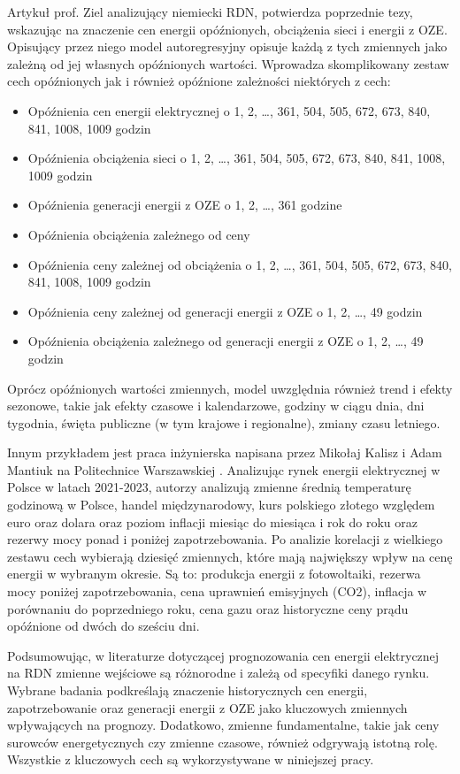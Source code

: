 Artykuł prof. Ziel \cite{ZIEL201598} analizujący niemiecki RDN, potwierdza poprzednie tezy, wskazując na znaczenie cen energii opóźnionych, obciążenia sieci i energii z OZE. Opisujący przez niego model autoregresyjny opisuje każdą z tych zmiennych jako zależną od jej własnych opóźnionych wartości. Wprowadza skomplikowany zestaw cech opóźnionych jak i również opóźnione zależności niektórych z cech:
\begin{itemize}
    \item Opóźnienia cen energii elektrycznej o 1, 2, …, 361, 504, 505, 672, 673, 840, 841, 1008, 1009 godzin
    \item Opóźnienia obciążenia sieci o 1, 2, …, 361, 504, 505, 672, 673, 840, 841, 1008, 1009 godzin
    \item Opóźnienia generacji energii z OZE o 1, 2, …, 361 godzine
    \item Opóźnienia obciążenia zależnego od ceny
    \item Opóźnienia ceny zależnej od obciążenia o 1, 2, …, 361, 504, 505, 672, 673, 840, 841, 1008, 1009 godzin
    \item Opóźnienia ceny zależnej od generacji energii z OZE o 1, 2, …, 49 godzin
    \item Opóźnienia obciążenia zależnego od generacji energii z OZE o 1, 2, …, 49 godzin
\end{itemize}
Oprócz opóźnionych wartości zmiennych, model uwzględnia również trend i efekty sezonowe, takie jak efekty czasowe i kalendarzowe, godziny w ciągu dnia, dni tygodnia, święta publiczne (w tym krajowe i regionalne), zmiany czasu letniego.

Innym przykładem jest praca inżynierska napisana przez Mikołaj Kalisz i Adam Mantiuk na Politechnice Warszawskiej \cite{MGR2025}. Analizując rynek energii elektrycznej w Polsce w latach 2021-2023, autorzy analizują zmienne średnią temperaturę godzinową w Polsce, handel międzynarodowy, kurs polskiego złotego względem euro oraz dolara oraz poziom inflacji miesiąc do miesiąca i rok do roku oraz rezerwy mocy ponad i poniżej zapotrzebowania. Po analizie korelacji z wielkiego zestawu cech wybierają dziesięć zmiennych, które mają największy wpływ na cenę energii w wybranym okresie. Są to: produkcja energii z fotowoltaiki, rezerwa mocy poniżej zapotrzebowania, cena uprawnień emisyjnych (CO2), inflacja w porównaniu do poprzedniego roku, cena gazu oraz historyczne ceny prądu opóźnione od dwóch do sześciu dni. 

Podsumowując, w literaturze dotyczącej prognozowania cen energii elektrycznej na RDN zmienne wejściowe są różnorodne i zależą od specyfiki danego rynku. Wybrane badania podkreślają znaczenie historycznych cen energii, zapotrzebowanie  oraz generacji energii z OZE jako kluczowych zmiennych wpływających na prognozy. Dodatkowo, zmienne fundamentalne, takie jak ceny surowców energetycznych czy zmienne czasowe, również odgrywają istotną rolę. Wszystkie z kluczowych cech są wykorzystywane w niniejszej pracy.

